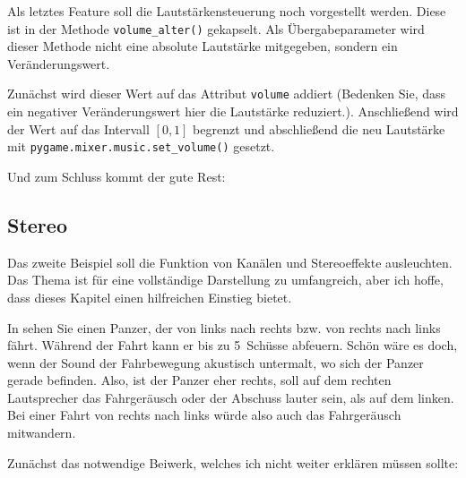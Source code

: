 
Als letztes Feature soll die Lautstärkensteuerung noch vorgestellt werden. Diese ist in der Methode \texttt{volume\_alter()} gekapselt. Als Übergabeparameter wird dieser Methode nicht eine absolute Lautstärke mitgegeben, sondern ein Veränderungswert. 

Zunächst wird dieser Wert auf das Attribut \texttt{volume} addiert (Bedenken Sie, dass ein negativer Veränderungswert hier die Lautstärke reduziert.). Anschließend wird der Wert auf das Intervall $[0, 1]$ begrenzt und abschließend die neu Lautstärke mit \texttt{pygame.mixer\-.music\-.set\-\_volume()} gesetzt.


Und zum Schluss kommt der gute Rest:


\subsection{Stereo}

Das zweite Beispiel soll die Funktion von Kanälen und \Acrshort{Stereo}effekte ausleuchten. Das Thema ist für eine vollständige Darstellung zu umfangreich, aber ich hoffe, dass dieses Kapitel einen hilfreichen Einstieg bietet.

In  sehen Sie einen Panzer, der von links nach rechts bzw. von rechts nach links fährt.  Während der Fahrt kann er bis zu 5~Schüsse abfeuern. Schön wäre es doch, wenn der Sound der Fahrbewegung akustisch untermalt, wo sich der Panzer gerade befinden. Also, ist der Panzer eher rechts, soll auf dem rechten Lautsprecher das Fahrgeräusch oder der Abschuss lauter sein, als auf dem linken. Bei einer Fahrt von rechts nach links würde also auch das Fahrgeräusch mitwandern.



Zunächst das notwendige Beiwerk, welches ich nicht weiter erklären müssen sollte:

